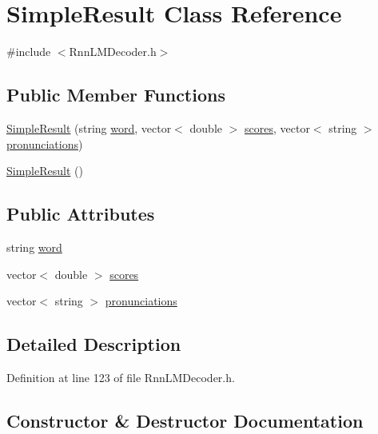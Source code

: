 \hypertarget{class_simple_result}{}\section{Simple\+Result Class Reference}
\label{class_simple_result}


{\ttfamily \#include $<$Rnn\+L\+M\+Decoder.\+h$>$}

\subsection*{Public Member Functions}
\begin{DoxyCompactItemize}
\item 
\hyperlink{class_simple_result_a978e70435d32a96d242fcc936b326616}{Simple\+Result} (string \hyperlink{class_simple_result_a75237d0ce77e05c035957c133589709d}{word}, vector$<$ double $>$ \hyperlink{class_simple_result_a31ab770eb57157cefc90bb0d2c06f2fd}{scores}, vector$<$ string $>$ \hyperlink{class_simple_result_afeda8e8c9e4034e4b6689846ef03290d}{pronunciations})
\item 
\hyperlink{class_simple_result_ac0f42f5083e0275d962bdc780e8cfacc}{Simple\+Result} ()
\end{DoxyCompactItemize}
\subsection*{Public Attributes}
\begin{DoxyCompactItemize}
\item 
string \hyperlink{class_simple_result_a75237d0ce77e05c035957c133589709d}{word}
\item 
vector$<$ double $>$ \hyperlink{class_simple_result_a31ab770eb57157cefc90bb0d2c06f2fd}{scores}
\item 
vector$<$ string $>$ \hyperlink{class_simple_result_afeda8e8c9e4034e4b6689846ef03290d}{pronunciations}
\end{DoxyCompactItemize}


\subsection{Detailed Description}


Definition at line 123 of file Rnn\+L\+M\+Decoder.\+h.



\subsection{Constructor \& Destructor Documentation}
